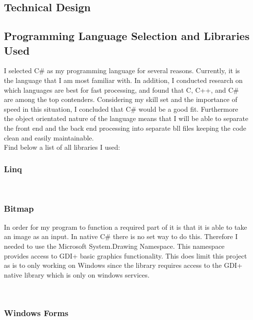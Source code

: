 \begin{flushleft}
    \large
    \section{Technical Design}

    \subsection{Programming Language Selection and Libraries Used}

    I selected C# as my programming language for several reasons. Currently, it is the language that I am most familiar with. In addition, I conducted research on which languages are best for fast processing, and found that C, C++, and C# are among the top contenders. Considering my skill set and the importance of speed in this situation, I concluded that C# would be a good fit. Furthermore the object orientated nature of the language means that I will be able to separate the front end and the back end processing into separate bll files keeping the code clean and easily maintainable.\\ 
    \bk
    Find below a list of all libraries I used: \\
    \subsubsection{Linq}
    
    
    \\ \bk



    \subsubsection{Bitmap}
    In order for my program to function a required part of it is that it is able to take an image as an input. In native C# there is no set way to do this. Therefore I needed to use the Microsoft System.Drawing Namespace. This namespace provides access to GDI+ basic graphics functionality. This does limit this project as is to only working on Windows since the library requires access to the GDI+ native library which is only on windows services.

    \\ \bk

    \subsubsection{Windows Forms}
   
    \\ \bk



\end{flushleft}